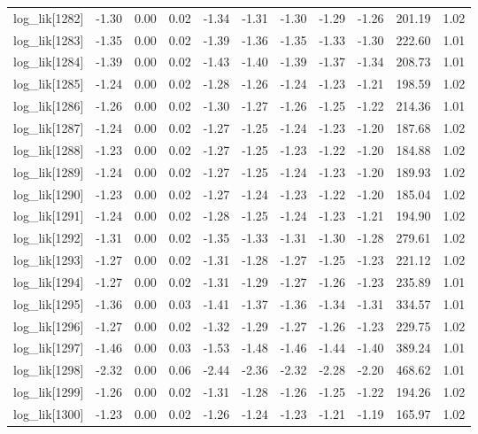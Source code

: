 \begin{table}[ht]
\begin{tabular}{rrrrrrrrrrr}
  log\_lik[1282] & -1.30 & 0.00 & 0.02 & -1.34 & -1.31 & -1.30 & -1.29 & -1.26 & 201.19 & 1.02 \\ 
  log\_lik[1283] & -1.35 & 0.00 & 0.02 & -1.39 & -1.36 & -1.35 & -1.33 & -1.30 & 222.60 & 1.01 \\ 
  log\_lik[1284] & -1.39 & 0.00 & 0.02 & -1.43 & -1.40 & -1.39 & -1.37 & -1.34 & 208.73 & 1.01 \\ 
  log\_lik[1285] & -1.24 & 0.00 & 0.02 & -1.28 & -1.26 & -1.24 & -1.23 & -1.21 & 198.59 & 1.02 \\ 
  log\_lik[1286] & -1.26 & 0.00 & 0.02 & -1.30 & -1.27 & -1.26 & -1.25 & -1.22 & 214.36 & 1.01 \\ 
  log\_lik[1287] & -1.24 & 0.00 & 0.02 & -1.27 & -1.25 & -1.24 & -1.23 & -1.20 & 187.68 & 1.02 \\ 
  log\_lik[1288] & -1.23 & 0.00 & 0.02 & -1.27 & -1.25 & -1.23 & -1.22 & -1.20 & 184.88 & 1.02 \\ 
  log\_lik[1289] & -1.24 & 0.00 & 0.02 & -1.27 & -1.25 & -1.24 & -1.23 & -1.20 & 189.93 & 1.02 \\ 
  log\_lik[1290] & -1.23 & 0.00 & 0.02 & -1.27 & -1.24 & -1.23 & -1.22 & -1.20 & 185.04 & 1.02 \\ 
  log\_lik[1291] & -1.24 & 0.00 & 0.02 & -1.28 & -1.25 & -1.24 & -1.23 & -1.21 & 194.90 & 1.02 \\ 
  log\_lik[1292] & -1.31 & 0.00 & 0.02 & -1.35 & -1.33 & -1.31 & -1.30 & -1.28 & 279.61 & 1.02 \\ 
  log\_lik[1293] & -1.27 & 0.00 & 0.02 & -1.31 & -1.28 & -1.27 & -1.25 & -1.23 & 221.12 & 1.02 \\ 
  log\_lik[1294] & -1.27 & 0.00 & 0.02 & -1.31 & -1.29 & -1.27 & -1.26 & -1.23 & 235.89 & 1.01 \\ 
  log\_lik[1295] & -1.36 & 0.00 & 0.03 & -1.41 & -1.37 & -1.36 & -1.34 & -1.31 & 334.57 & 1.01 \\ 
  log\_lik[1296] & -1.27 & 0.00 & 0.02 & -1.32 & -1.29 & -1.27 & -1.26 & -1.23 & 229.75 & 1.02 \\ 
  log\_lik[1297] & -1.46 & 0.00 & 0.03 & -1.53 & -1.48 & -1.46 & -1.44 & -1.40 & 389.24 & 1.01 \\ 
  log\_lik[1298] & -2.32 & 0.00 & 0.06 & -2.44 & -2.36 & -2.32 & -2.28 & -2.20 & 468.62 & 1.01 \\ 
  log\_lik[1299] & -1.26 & 0.00 & 0.02 & -1.31 & -1.28 & -1.26 & -1.25 & -1.22 & 194.26 & 1.02 \\ 
  log\_lik[1300] & -1.23 & 0.00 & 0.02 & -1.26 & -1.24 & -1.23 & -1.21 & -1.19 & 165.97 & 1.02 \\ 

\end{tabular}
\end{table}

